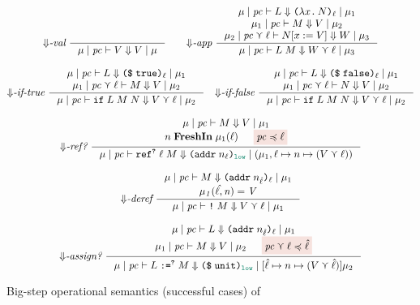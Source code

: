 \begin{figure}[tbp]
  \raggedright
  {\small
  \begin{gather*}
  {\Downarrow}\textit{-val}~
  \inference{}{\bigstep{\mu}{\pc}{V}{V}{\mu}}
  \qquad
  {\Downarrow}\textit{-app}~
  \inference
  {\bigstep{\mu}{\pc}{L}{\dynlam{x}{N}{\ell}}{\mu_1} \\
   \bigstep{\mu_1}{\pc}{M}{V}{\mu_2} \\
   \bigstep{\mu_2}{\pc \curlyvee \ell}{N[ x := V ]}{W}{\mu_3}}
  {\bigstep{\mu}{\pc}{L \; M}{W \curlyvee \ell}{\mu_3}}
  \\[2ex]
  {\Downarrow}\textit{-if-true}~
  \inference
  {\bigstep{\mu}{\pc}{L}{\dynconst{\true}{\ell}}{\mu_1} \\
   \bigstep{\mu_1}{\pc \curlyvee \ell}{M}{V}{\mu_2}}
  {\bigstep{\mu}{\pc}{\dynif{L}{M}{N}}{V \curlyvee \ell}{\mu_2}}
  \quad
  {\Downarrow}\textit{-if-false}~
  \inference
  {\bigstep{\mu}{\pc}{L}{\dynconst{\false}{\ell}}{\mu_1} \\
   \bigstep{\mu_1}{\pc \curlyvee \ell}{N}{V}{\mu_2}}
  {\bigstep{\mu}{\pc}{\dynif{L}{M}{N}}{V \curlyvee \ell}{\mu_2}}
  \\[2ex]
    {\Downarrow}\textit{-ref?}~
    \inference
        {\bigstep{\mu}{\pc}{M}{V}{\mu_1} \\
          n \; \mathbf{FreshIn} \; \mu_1(\ell) & \highlightred{\pc \preccurlyeq \ell}}
        {\bigstep{\mu}{\pc}{\dynref{?}{\ell}{M}}{\dynaddr{n_{\ell}}{\low}}{(\mu_1, \ell \mapsto n \mapsto (V \curlyvee \ell))}}
  \\[2ex]
  {\Downarrow}\textit{-deref}~
  \inference
  {\bigstep{\mu}{\pc}{M}{\dynaddr{n_{\hat{\ell}}}{\ell}}{\mu_1} \\
    \mathit{\mu_1(\hat{\ell},n) = V}}
  {\bigstep{\mu}{\pc}{\dynderef{M}}{V \curlyvee \ell}{\mu_1}}
  \\[2ex]
  {\Downarrow}\textit{-assign?}~
  \inference
  {\bigstep{\mu}{\pc}{L}{\dynaddr{n_{\hat{\ell}}}{\ell}}{\mu_1} \\
   \bigstep{\mu_1}{\pc}{M}{V}{\mu_2} &
   \highlightred{\pc \curlyvee \ell \preccurlyeq \hat{\ell}}}
  {\bigstep{\mu}{\pc}{\dynassign{L}{?}{M}}{\dynconst{\unit}{\low}}{[\hat{\ell} \mapsto n \mapsto (V \curlyvee \hat{\ell})] \mu_2}}
  \end{gather*} }
  \caption{Big-step operational semantics (successful cases) of \DynIFC}
  \label{fig:big-step-dyn}
\end{figure}


